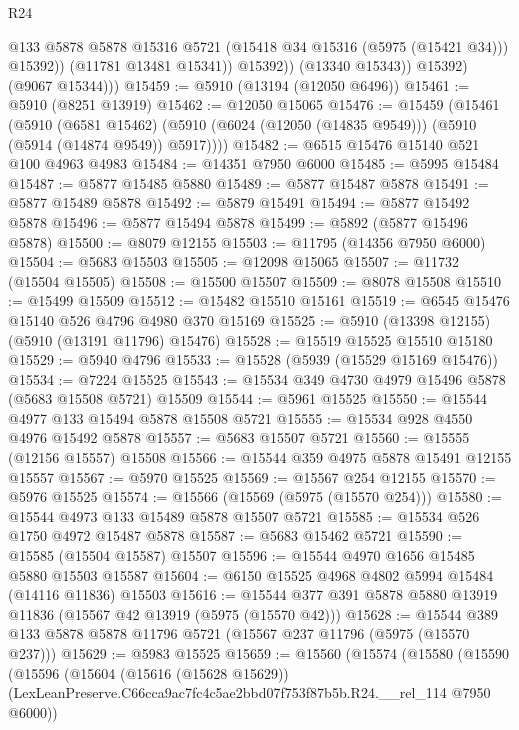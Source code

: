 \begin{lexlean}{R24}
\begin{coremodule}
                      @133
                      @5878
                      @5878
                      @15316
                      @5721
                      (@15418 @34 @15316 (@5975 (@15421 @34)))
                      @15392))
                  (@11781 @13481 @15341))
                @15392))
            (@13340 @15343))
          @15392)
        (@9067 @15344)))
@15459 := @5910 (@13194 (@12050 @6496))
@15461 := @5910 (@8251 @13919)
@15462 := @12050 @15065
@15476 := @15459
    (@15461
      (@5910
        (@6581 @15462)
        (@5910 (@6024 (@12050 (@14835 @9549))) (@5910 (@5914 (@14874 @9549)) @5917))))
@15482 := @6515 @15476 @15140 @521 @100 @4963 @4983
@15484 := @14351 @7950 @6000
@15485 := @5995 @15484
@15487 := @5877 @15485 @5880
@15489 := @5877 @15487 @5878
@15491 := @5877 @15489 @5878
@15492 := @5879 @15491
@15494 := @5877 @15492 @5878
@15496 := @5877 @15494 @5878
@15499 := @5892 (@5877 @15496 @5878)
@15500 := @8079 @12155
@15503 := @11795 (@14356 @7950 @6000)
@15504 := @5683 @15503
@15505 := @12098 @15065
@15507 := @11732 (@15504 @15505)
@15508 := @15500 @15507
@15509 := @8078 @15508
@15510 := @15499 @15509
@15512 := @15482 @15510 @15161
@15519 := @6545 @15476 @15140 @526 @4796 @4980 @370 @15169
@15525 := @5910 (@13398 @12155) (@5910 (@13191 @11796) @15476)
@15528 := @15519 @15525 @15510 @15180
@15529 := @5940 @4796
@15533 := @15528 (@5939 (@15529 @15169 @15476))
@15534 := @7224 @15525
@15543 := @15534 @349 @4730 @4979 @15496 @5878 (@5683 @15508 @5721) @15509
@15544 := @5961 @15525
@15550 := @15544 @4977 @133 @15494 @5878 @15508 @5721
@15555 := @15534 @928 @4550 @4976 @15492 @5878
@15557 := @5683 @15507 @5721
@15560 := @15555 (@12156 @15557) @15508
@15566 := @15544 @359 @4975 @5878 @15491 @12155 @15557
@15567 := @5970 @15525
@15569 := @15567 @254 @12155
@15570 := @5976 @15525
@15574 := @15566 (@15569 (@5975 (@15570 @254)))
@15580 := @15544 @4973 @133 @15489 @5878 @15507 @5721
@15585 := @15534 @526 @1750 @4972 @15487 @5878
@15587 := @5683 @15462 @5721
@15590 := @15585 (@15504 @15587) @15507
@15596 := @15544 @4970 @1656 @15485 @5880 @15503 @15587
@15604 := @6150 @15525 @4968 @4802 @5994 @15484 (@14116 @11836) @15503
@15616 := @15544 @377 @391 @5878 @5880 @13919 @11836 (@15567 @42 @13919 (@5975 (@15570 @42)))
@15628 := @15544 @389 @133 @5878 @5878 @11796 @5721 (@15567 @237 @11796 (@5975 (@15570 @237)))
@15629 := @5983 @15525
@15659 := @15560
    (@15574
      (@15580
        (@15590
          (@15596
            (@15604
              (@15616 (@15628 @15629))
              (LexLeanPreserve.C66cca9ac7fc4c5ae2bbd07f753f87b5b.R24.__rel_114 @7950 @6000))

\end{coremodule}
\end{lexlean}
